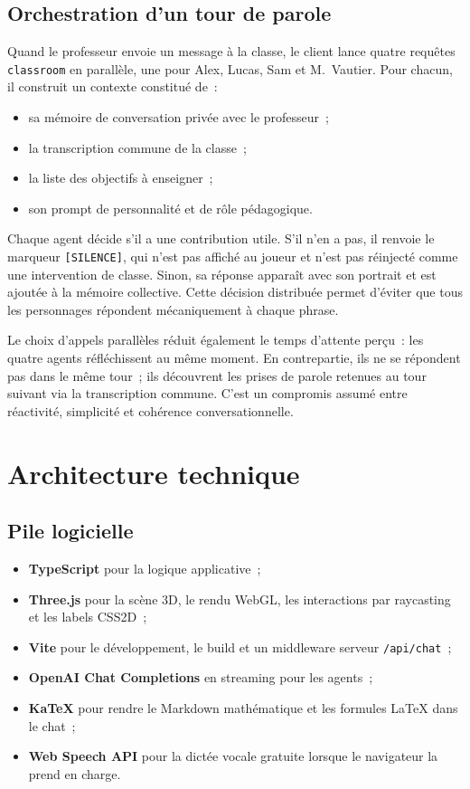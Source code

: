 \documentclass[11pt,a4paper]{article}
\begin{document}
\subsection{Orchestration d'un tour de parole}

Quand le professeur envoie un message à la classe, le client lance quatre requêtes \texttt{classroom} en parallèle, une pour Alex, Lucas, Sam et M.~Vautier. Pour chacun, il construit un contexte constitué de~:

\begin{itemize}
  \item sa mémoire de conversation privée avec le professeur~;
  \item la transcription commune de la classe~;
  \item la liste des objectifs à enseigner~;
  \item son prompt de personnalité et de rôle pédagogique.
\end{itemize}

Chaque agent décide s'il a une contribution utile. S'il n'en a pas, il renvoie le marqueur \texttt{[SILENCE]}, qui n'est pas affiché au joueur et n'est pas réinjecté comme une intervention de classe. Sinon, sa réponse apparaît avec son portrait et est ajoutée à la mémoire collective. Cette décision distribuée permet d'éviter que tous les personnages répondent mécaniquement à chaque phrase.

Le choix d'appels parallèles réduit également le temps d'attente perçu~: les quatre agents réfléchissent au même moment. En contrepartie, ils ne se répondent pas dans le même tour~; ils découvrent les prises de parole retenues au tour suivant via la transcription commune. C'est un compromis assumé entre réactivité, simplicité et cohérence conversationnelle.

\section{Architecture technique}

\subsection{Pile logicielle}

\begin{itemize}
  \item \textbf{TypeScript} pour la logique applicative~;
  \item \textbf{Three.js} pour la scène 3D, le rendu WebGL, les interactions par raycasting et les labels CSS2D~;
  \item \textbf{Vite} pour le développement, le build et un middleware serveur \texttt{/api/chat}~;
  \item \textbf{OpenAI Chat Completions} en streaming pour les agents~;
  \item \textbf{KaTeX} pour rendre le Markdown mathématique et les formules LaTeX dans le chat~;
  \item \textbf{Web Speech API} pour la dictée vocale gratuite lorsque le navigateur la prend en charge.
\end{itemize}
\end{document}
